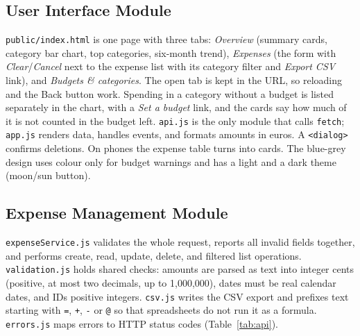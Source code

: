 \documentclass[11pt,a4paper]{article}
\begin{document}
\subsection{User Interface Module}

\texttt{public/index.html} is one page with three tabs: \emph{Overview}
(summary cards, category bar chart, top categories, six-month trend),
\emph{Expenses} (the form with \emph{Clear}/\emph{Cancel} next to the
expense list with its category filter and \emph{Export CSV} link), and
\emph{Budgets \& categories}. The open tab is kept in the URL, so reloading
and the Back button work. Spending in a category without a budget is
listed separately in the chart, with a \emph{Set a budget} link, and the
cards say how much of it is not counted in the budget left.
\texttt{api.js} is the only module that calls
\texttt{fetch}; \texttt{app.js} renders data, handles events, and formats
amounts in euros. A \texttt{<dialog>} confirms deletions. On phones the
expense table turns into cards. The blue-grey design uses colour only for
budget warnings and has a light and a dark theme (moon/sun button).

\subsection{Expense Management Module}

\texttt{expenseService.js} validates the whole request, reports all
invalid fields together, and performs create, read, update, delete, and
filtered list operations. \texttt{validation.js} holds shared checks:
amounts are parsed as text into integer cents (positive, at most two
decimals, up to 1{,}000{,}000), dates must be real calendar dates, and
IDs positive integers. \texttt{csv.js} writes the CSV export and
prefixes text starting with \texttt{=}, \texttt{+}, \texttt{-} or
\texttt{@} so that spreadsheets do not run it as a formula.
\texttt{errors.js} maps errors to HTTP status codes (Table~\ref{tab:api}).
\end{document}

